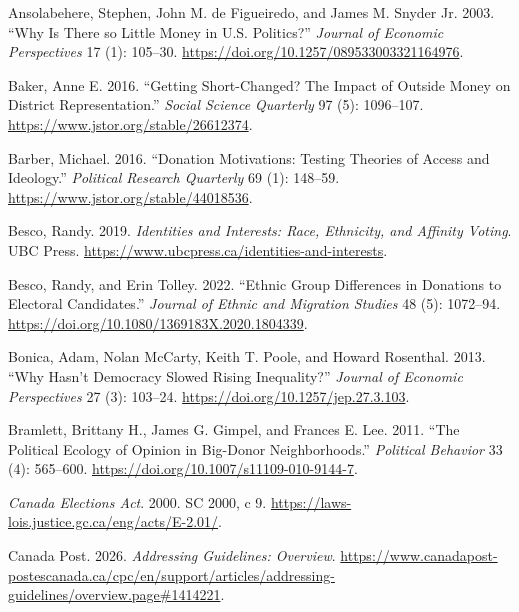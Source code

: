 \documentclass[
  letterpaper,
  DIV=11,
  numbers=noendperiod]{scrartcl}
\newlength{\cslhangindent}
\newenvironment{CSLReferences}[2] %
 {\begin{list}{}{%
  \setlength{\itemindent}{0pt}
  \setlength{\leftmargin}{0pt}
  \setlength{\parsep}{0pt}
  \ifodd #1
   \setlength{\leftmargin}{\cslhangindent}
   \setlength{\itemindent}{-1\cslhangindent}
  \fi
  \setlength{\itemsep}{#2\baselineskip}}}
 {\end{list}}
\begin{document}
\protect{}\label{refs}
\begin{CSLReferences}{1}{1}
Ansolabehere, Stephen, John M. de Figueiredo, and James M. Snyder Jr.
2003. {``Why Is {There} so {Little} {Money} in {U}.{S}. {Politics}?''}
\emph{Journal of Economic Perspectives} 17 (1): 105--30.
\url{https://doi.org/10.1257/089533003321164976}.

Baker, Anne E. 2016. {``Getting {Short}-{Changed}? {The} {Impact} of
{Outside} {Money} on {District} {Representation}.''} \emph{Social
Science Quarterly} 97 (5): 1096--107.
\url{https://www.jstor.org/stable/26612374}.

Barber, Michael. 2016. {``Donation {Motivations}: {Testing} {Theories}
of {Access} and {Ideology}.''} \emph{Political Research Quarterly} 69
(1): 148--59. \url{https://www.jstor.org/stable/44018536}.

Besco, Randy. 2019. \emph{Identities and {Interests}: {Race},
{Ethnicity}, and {Affinity} {Voting}}. UBC Press.
\url{https://www.ubcpress.ca/identities-and-interests}.

Besco, Randy, and Erin Tolley. 2022. {``Ethnic Group Differences in
Donations to Electoral Candidates.''} \emph{Journal of Ethnic and
Migration Studies} 48 (5): 1072--94.
\url{https://doi.org/10.1080/1369183X.2020.1804339}.

Bonica, Adam, Nolan McCarty, Keith T. Poole, and Howard Rosenthal. 2013.
{``Why Hasn't Democracy Slowed Rising Inequality?''} \emph{Journal of
Economic Perspectives} 27 (3): 103--24.
\url{https://doi.org/10.1257/jep.27.3.103}.

Bramlett, Brittany H., James G. Gimpel, and Frances E. Lee. 2011. {``The
{Political} {Ecology} of {Opinion} in {Big}-{Donor} {Neighborhoods}.''}
\emph{Political Behavior} 33 (4): 565--600.
\url{https://doi.org/10.1007/s11109-010-9144-7}.

\emph{Canada Elections Act}. 2000. SC 2000, c 9.
\url{https://laws-lois.justice.gc.ca/eng/acts/E-2.01/}.

Canada Post. 2026. \emph{Addressing Guidelines: Overview}.
\url{https://www.canadapost-postescanada.ca/cpc/en/support/articles/addressing-guidelines/overview.page\#1414221}.


\end{CSLReferences}
\end{document}
